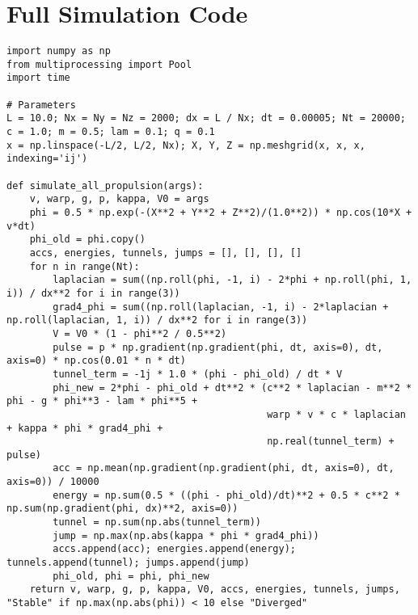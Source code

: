 \documentclass[11pt]{article}
\begin{document}
\section{Full Simulation Code}
\lstset{language=Python, basicstyle=\footnotesize\ttfamily, breaklines=true, numbers=left}
\begin{lstlisting}
import numpy as np
from multiprocessing import Pool
import time

# Parameters
L = 10.0; Nx = Ny = Nz = 2000; dx = L / Nx; dt = 0.00005; Nt = 20000; c = 1.0; m = 0.5; lam = 0.1; q = 0.1
x = np.linspace(-L/2, L/2, Nx); X, Y, Z = np.meshgrid(x, x, x, indexing='ij')

def simulate_all_propulsion(args):
    v, warp, g, p, kappa, V0 = args
    phi = 0.5 * np.exp(-(X**2 + Y**2 + Z**2)/(1.0**2)) * np.cos(10*X + v*dt)
    phi_old = phi.copy()
    accs, energies, tunnels, jumps = [], [], [], []
    for n in range(Nt):
        laplacian = sum((np.roll(phi, -1, i) - 2*phi + np.roll(phi, 1, i)) / dx**2 for i in range(3))
        grad4_phi = sum((np.roll(laplacian, -1, i) - 2*laplacian + np.roll(laplacian, 1, i)) / dx**2 for i in range(3))
        V = V0 * (1 - phi**2 / 0.5**2)
        pulse = p * np.gradient(np.gradient(phi, dt, axis=0), dt, axis=0) * np.cos(0.01 * n * dt)
        tunnel_term = -1j * 1.0 * (phi - phi_old) / dt * V
        phi_new = 2*phi - phi_old + dt**2 * (c**2 * laplacian - m**2 * phi - g * phi**3 - lam * phi**5 + 
                                             warp * v * c * laplacian + kappa * phi * grad4_phi + 
                                             np.real(tunnel_term) + pulse)
        acc = np.mean(np.gradient(np.gradient(phi, dt, axis=0), dt, axis=0)) / 10000
        energy = np.sum(0.5 * ((phi - phi_old)/dt)**2 + 0.5 * c**2 * np.sum(np.gradient(phi, dx)**2, axis=0))
        tunnel = np.sum(np.abs(tunnel_term))
        jump = np.max(np.abs(kappa * phi * grad4_phi))
        accs.append(acc); energies.append(energy); tunnels.append(tunnel); jumps.append(jump)
        phi_old, phi = phi, phi_new
    return v, warp, g, p, kappa, V0, accs, energies, tunnels, jumps, "Stable" if np.max(np.abs(phi)) < 10 else "Diverged"


\end{lstlisting}
\end{document}
